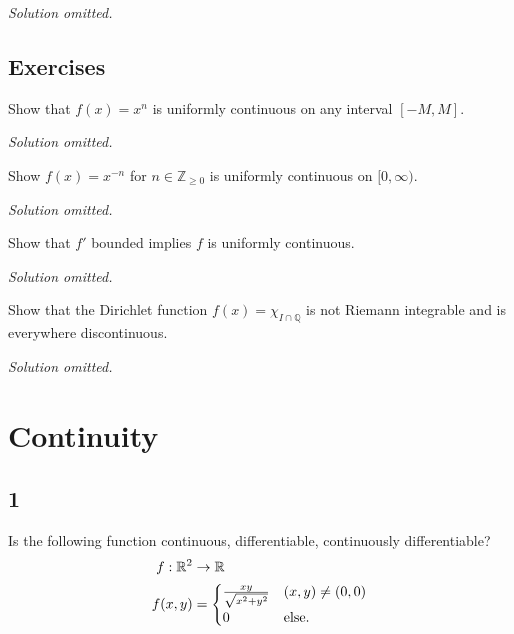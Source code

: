 \emph{Solution omitted.}

\hypertarget{exercises}{%
\subsection{Exercises}\label{exercises}}

\begin{problem}

Show that \(f(x) = x^n\) is uniformly continuous on any interval
\([-M, M]\).

\end{problem}

\emph{Solution omitted.}

\begin{problem}[?]

Show \(f(x) = x^{-n}\) for \(n\in {\mathbb{Z}}_{\geq 0}\) is uniformly
continuous on \([0, \infty)\).

\end{problem}

\emph{Solution omitted.}

\begin{problem}[?]

Show that \(f'\) bounded implies \(f\) is uniformly continuous.

\end{problem}

\emph{Solution omitted.}

\begin{problem}[?]

Show that the Dirichlet function \(f(x) = \chi_{I \cap{\mathbb{Q}}}\) is
not Riemann integrable and is everywhere discontinuous.

\end{problem}

\emph{Solution omitted.}

\hypertarget{continuity}{%
\section{Continuity}\label{continuity}}

\hypertarget{section-2}{%
\subsection{1}\label{section-2}}

Is the following function continuous, differentiable, continuously
differentiable?
\begin{align*}  
f: {\mathbb{R}}^2 &\to {\mathbb{R}}\\
f(x, y) &= 
\begin{cases}
{xy \over \sqrt{x^2 + y^2}} & (x, y) \neq (0, 0) \\
0 & \text{else}.
\end{cases}
\end{align*}

